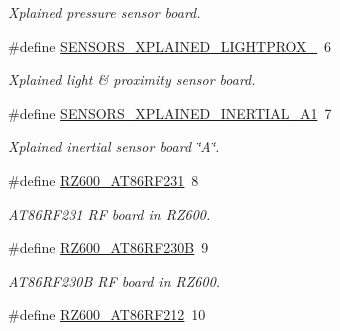 \begin{DoxyCompactItemize}
\begin{DoxyCompactList}\small\item\em Xplained pressure sensor board. \end{DoxyCompactList}\item 
\hypertarget{group__group__common__boards_ga0a1006037bf18d016accfdea4a1105ae}{\#define \hyperlink{group__group__common__boards_ga0a1006037bf18d016accfdea4a1105ae}{S\-E\-N\-S\-O\-R\-S\-\_\-\-X\-P\-L\-A\-I\-N\-E\-D\-\_\-\-L\-I\-G\-H\-T\-P\-R\-O\-X\-\_}~6}\label{group__group__common__boards_ga0a1006037bf18d016accfdea4a1105ae}

\begin{DoxyCompactList}\small\item\em Xplained light \& proximity sensor board. \end{DoxyCompactList}\item 
\hypertarget{group__group__common__boards_ga7796d1fa6e31b50714c391877e095801}{\#define \hyperlink{group__group__common__boards_ga7796d1fa6e31b50714c391877e095801}{S\-E\-N\-S\-O\-R\-S\-\_\-\-X\-P\-L\-A\-I\-N\-E\-D\-\_\-\-I\-N\-E\-R\-T\-I\-A\-L\-\_\-\-A1}~7}\label{group__group__common__boards_ga7796d1fa6e31b50714c391877e095801}

\begin{DoxyCompactList}\small\item\em Xplained inertial sensor board \char`\"{}\-A\char`\"{}. \end{DoxyCompactList}\item 
\hypertarget{group__group__common__boards_gab07c6fafd717c9bf1fcf482710a10f9d}{\#define \hyperlink{group__group__common__boards_gab07c6fafd717c9bf1fcf482710a10f9d}{R\-Z600\-\_\-\-A\-T86\-R\-F231}~8}\label{group__group__common__boards_gab07c6fafd717c9bf1fcf482710a10f9d}

\begin{DoxyCompactList}\small\item\em A\-T86\-R\-F231 R\-F board in R\-Z600. \end{DoxyCompactList}\item 
\hypertarget{group__group__common__boards_gabfbfb1013bb6a4eb8f445c7e06af3178}{\#define \hyperlink{group__group__common__boards_gabfbfb1013bb6a4eb8f445c7e06af3178}{R\-Z600\-\_\-\-A\-T86\-R\-F230\-B}~9}\label{group__group__common__boards_gabfbfb1013bb6a4eb8f445c7e06af3178}

\begin{DoxyCompactList}\small\item\em A\-T86\-R\-F230\-B R\-F board in R\-Z600. \end{DoxyCompactList}\item 
\hypertarget{group__group__common__boards_ga06539607f7c8a0104557c4b4cc7ac175}{\#define \hyperlink{group__group__common__boards_ga06539607f7c8a0104557c4b4cc7ac175}{R\-Z600\-\_\-\-A\-T86\-R\-F212}~10}\label{group__group__common__boards_ga06539607f7c8a0104557c4b4cc7ac175}


\end{DoxyCompactItemize}
